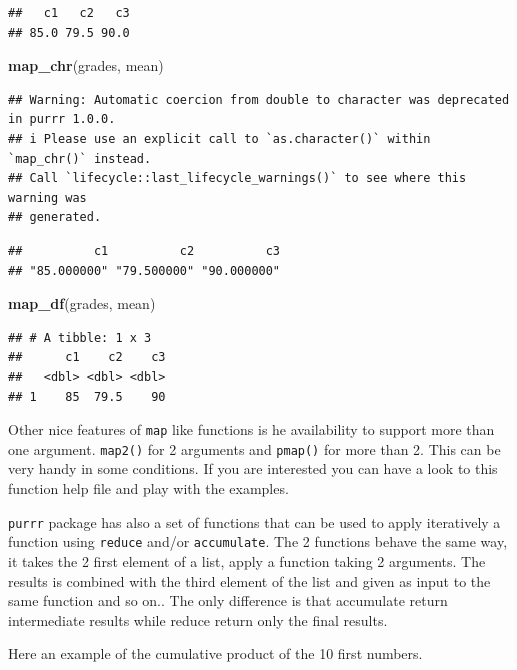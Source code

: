 \documentclass[
]{book}
\newenvironment{Shaded}{\begin{snugshade}}{\end{snugshade}}
\newcommand{\FunctionTok}[1]{\textcolor[rgb]{0.13,0.29,0.53}{\textbf{#1}}}
\newcommand{\NormalTok}[1]{#1}
\begin{document}
\begin{verbatim}
##   c1   c2   c3 
## 85.0 79.5 90.0
\end{verbatim}

\begin{Shaded}
\begin{Highlighting}[]
\FunctionTok{map\_chr}\NormalTok{(grades, mean)}
\end{Highlighting}
\end{Shaded}

\begin{verbatim}
## Warning: Automatic coercion from double to character was deprecated in purrr 1.0.0.
## i Please use an explicit call to `as.character()` within `map_chr()` instead.
## Call `lifecycle::last_lifecycle_warnings()` to see where this warning was
## generated.
\end{verbatim}

\begin{verbatim}
##          c1          c2          c3 
## "85.000000" "79.500000" "90.000000"
\end{verbatim}

\begin{Shaded}
\begin{Highlighting}[]
\FunctionTok{map\_df}\NormalTok{(grades, mean)}
\end{Highlighting}
\end{Shaded}

\begin{verbatim}
## # A tibble: 1 x 3
##      c1    c2    c3
##   <dbl> <dbl> <dbl>
## 1    85  79.5    90
\end{verbatim}

Other nice features of \texttt{map} like functions is he availability to support more than one argument.
\texttt{map2()} for 2 arguments and \texttt{pmap()} for more than 2. This can be very handy in some conditions.
If you are interested you can have a look to this function help file and play with the examples.

\texttt{purrr} package has also a set of functions that can be used to apply iteratively a function using \texttt{reduce} and/or \texttt{accumulate}. The 2 functions behave the same way, it takes the 2 first element of a list, apply a function taking 2 arguments. The results is combined with the third element of the list and given as input to the same function and so on.. The only difference is that accumulate return intermediate results while reduce return only the final results.

Here an example of the cumulative product of the 10 first numbers.
\end{document}
